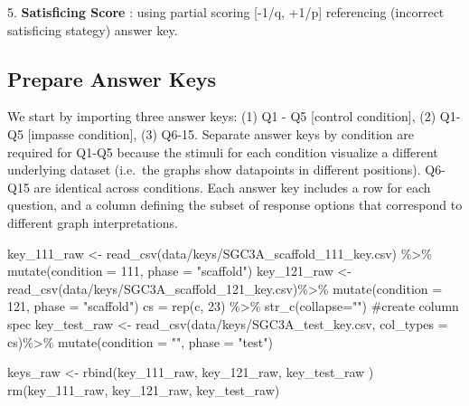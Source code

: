 \documentclass[
  letterpaper,
  DIV=11,
  numbers=noendperiod]{scrreprt}
\newenvironment{Shaded}{\begin{snugshade}}{\end{snugshade}}
\newcommand{\AttributeTok}[1]{\textcolor[rgb]{0.40,0.45,0.13}{#1}}
\newcommand{\CommentTok}[1]{\textcolor[rgb]{0.37,0.37,0.37}{#1}}
\newcommand{\DecValTok}[1]{\textcolor[rgb]{0.68,0.00,0.00}{#1}}
\newcommand{\FunctionTok}[1]{\textcolor[rgb]{0.28,0.35,0.67}{#1}}
\newcommand{\NormalTok}[1]{\textcolor[rgb]{0.00,0.23,0.31}{#1}}
\newcommand{\OtherTok}[1]{\textcolor[rgb]{0.00,0.23,0.31}{#1}}
\newcommand{\SpecialCharTok}[1]{\textcolor[rgb]{0.37,0.37,0.37}{#1}}
\newcommand{\StringTok}[1]{\textcolor[rgb]{0.13,0.47,0.30}{#1}}
\begin{document}
5. \textbf{Satisficing Score} : using partial scoring {[}-1/q, +1/p{]}
referencing (incorrect satisficing stategy) answer key.

\hypertarget{prepare-answer-keys}{%
\subsection{Prepare Answer Keys}\label{prepare-answer-keys}}

We start by importing three answer keys: (1) Q1 - Q5 {[}control
condition{]}, (2) Q1-Q5 {[}impasse condition{]}, (3) Q6-15. Separate
answer keys by condition are required for Q1-Q5 because the stimuli for
each condition visualize a different underlying dataset (i.e.~the graphs
show datapoints in different positions). Q6-Q15 are identical across
conditions. Each answer key includes a row for each question, and a
column defining the subset of response options that correspond to
different graph interpretations.

\begin{Shaded}
\begin{Highlighting}[]
\NormalTok{key\_111\_raw }\OtherTok{\textless{}{-}} \FunctionTok{read\_csv}\NormalTok{(}\StringTok{\textquotesingle{}data/keys/SGC3A\_scaffold\_111\_key.csv\textquotesingle{}}\NormalTok{) }\SpecialCharTok{\%\textgreater{}\%} \FunctionTok{mutate}\NormalTok{(}\AttributeTok{condition =} \DecValTok{111}\NormalTok{, }\AttributeTok{phase =} \StringTok{"scaffold"}\NormalTok{)}
\NormalTok{key\_121\_raw }\OtherTok{\textless{}{-}} \FunctionTok{read\_csv}\NormalTok{(}\StringTok{\textquotesingle{}data/keys/SGC3A\_scaffold\_121\_key.csv\textquotesingle{}}\NormalTok{)}\SpecialCharTok{\%\textgreater{}\%} \FunctionTok{mutate}\NormalTok{(}\AttributeTok{condition =} \DecValTok{121}\NormalTok{, }\AttributeTok{phase =} \StringTok{"scaffold"}\NormalTok{)}
\NormalTok{cs }\OtherTok{=} \FunctionTok{rep}\NormalTok{(}\StringTok{\textquotesingle{}c\textquotesingle{}}\NormalTok{, }\DecValTok{23}\NormalTok{) }\SpecialCharTok{\%\textgreater{}\%} \FunctionTok{str\_c}\NormalTok{(}\AttributeTok{collapse=}\StringTok{""}\NormalTok{) }\CommentTok{\#create column spec }
\NormalTok{key\_test\_raw }\OtherTok{\textless{}{-}} \FunctionTok{read\_csv}\NormalTok{(}\StringTok{\textquotesingle{}data/keys/SGC3A\_test\_key.csv\textquotesingle{}}\NormalTok{, }\AttributeTok{col\_types =}\NormalTok{ cs)}\SpecialCharTok{\%\textgreater{}\%} \FunctionTok{mutate}\NormalTok{(}\AttributeTok{condition =} \StringTok{""}\NormalTok{, }\AttributeTok{phase =} \StringTok{"test"}\NormalTok{) }

\NormalTok{keys\_raw }\OtherTok{\textless{}{-}} \FunctionTok{rbind}\NormalTok{(key\_111\_raw, key\_121\_raw, key\_test\_raw )}
\FunctionTok{rm}\NormalTok{(key\_111\_raw, key\_121\_raw, key\_test\_raw)}
\end{Highlighting}
\end{Shaded}
\end{document}
